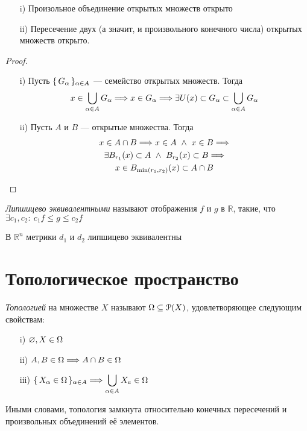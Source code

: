 \begin{theorem}
    \enewline
    \begin{itemize}
        \item[i)] Произольное объединение открытых множеств открыто
        \item[ii)] Пересечение двух (а значит, и произвольного конечного числа)
        открытых множеств открыто.
    \end{itemize}
\end{theorem}
\begin{proof}
    \enewline
    \begin{itemize}
        \item[i)] Пусть $\{\, G_\alpha \,\}_{\alpha \in A}$ --- семейство открытых множеств. Тогда
        \begin{gather*}
            x \in \bigcup_{\alpha \in A}{G_\alpha} \Longrightarrow x \in G_\alpha \Longrightarrow \exists U(x)
            \subset G_\alpha \subset \bigcup_{\alpha \in A}{G_\alpha}
        \end{gather*}
        \item[ii)] Пусть $A$ и $B$ --- открытые множества. Тогда
        \begin{gather*}
            x \in A \cap B \Longrightarrow x \in A ~\wedge~ x \in B \Longrightarrow \\
            \exists B_{r_1}(x) \subset A ~\wedge~ B_{r_2}(x) \subset B \Longrightarrow \\
            x \in B_{\min(r_1, r_2)}(x) \subset A \cap B
        \end{gather*}
    \end{itemize}
\end{proof}

\begin{definition}
    \textit{Липшицево эквивалентными} называют отображения $f$ и $g$ в
    $\mathbb{R}$, такие, что $\exists c_1, c_2 \colon~ c_1f \leqslant g \leqslant
    c_2f$
\end{definition}
\begin{example}
    В $\mathbb{R}^n$ метрики $d_1$ и $d_2$ липшицево эквивалентны
\end{example}

\newpage

\section{Топологическое пространство}

\begin{definition}
    \textit{Топологией} на множестве $X$ называют $\Omega \subseteq \mathcal{P}(X)$,
    удовлетворяющее следующим свойствам:
    \begin{itemize}
        \item[i)] $\varnothing, X \in \Omega$
        \item[ii)] $A, B \in \Omega \Longrightarrow A \cap B \in \Omega$
        \item[iii)] $\displaystyle \{\, X_\alpha \in \Omega \,\}_{\alpha \in A} \Longrightarrow
        \bigcup_{\alpha \in A}{X_a}\in \Omega$
    \end{itemize}
    Иными словами, топология замкнута относительно конечных пересечений и
    произвольных объединений её элементов.
\end{definition}

